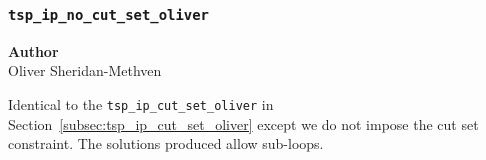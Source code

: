 \subsubsection{\texttt{tsp\_ip\_no\_cut\_set\_oliver}}
\label{subsubsec:tsp_ip_no_cut_set_oliver}

\begin{flushright}
\textbf{Author} \\
Oliver Sheridan-Methven
\end{flushright}

Identical to the \verb|tsp_ip_cut_set_oliver| in Section~\ref{subsec:tsp_ip_cut_set_oliver} except we do not impose the cut set constraint. The solutions produced allow sub-loops.